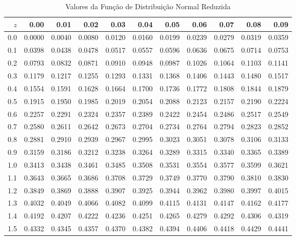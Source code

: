 \begin{table}[ht]
\centering
\begin{minipage}{10cm}
\caption{Valores da Função de Distribuição Normal Reduzida}
\end{minipage}
\begin{tabular}{r||rrrrrrrrrr}
  \hline
 $z$ & 0.00 & 0.01 & 0.02 & 0.03 & 0.04 & 0.05 & 0.06 & 0.07 & 0.08 & 0.09 \\ 
  \hline
  0.0 & 0.0000 & 0.0040 & 0.0080 & 0.0120 & 0.0160 & 0.0199 & 0.0239 & 0.0279 & 0.0319 & 0.0359 \\ 
  0.1 & 0.0398 & 0.0438 & 0.0478 & 0.0517 & 0.0557 & 0.0596 & 0.0636 & 0.0675 & 0.0714 & 0.0753 \\ 
  0.2 & 0.0793 & 0.0832 & 0.0871 & 0.0910 & 0.0948 & 0.0987 & 0.1026 & 0.1064 & 0.1103 & 0.1141 \\ 
  0.3 & 0.1179 & 0.1217 & 0.1255 & 0.1293 & 0.1331 & 0.1368 & 0.1406 & 0.1443 & 0.1480 & 0.1517 \\ 
  0.4 & 0.1554 & 0.1591 & 0.1628 & 0.1664 & 0.1700 & 0.1736 & 0.1772 & 0.1808 & 0.1844 & 0.1879 \\ 
  0.5 & 0.1915 & 0.1950 & 0.1985 & 0.2019 & 0.2054 & 0.2088 & 0.2123 & 0.2157 & 0.2190 & 0.2224 \\ 
  0.6 & 0.2257 & 0.2291 & 0.2324 & 0.2357 & 0.2389 & 0.2422 & 0.2454 & 0.2486 & 0.2517 & 0.2549 \\ 
  0.7 & 0.2580 & 0.2611 & 0.2642 & 0.2673 & 0.2704 & 0.2734 & 0.2764 & 0.2794 & 0.2823 & 0.2852 \\ 
  0.8 & 0.2881 & 0.2910 & 0.2939 & 0.2967 & 0.2995 & 0.3023 & 0.3051 & 0.3078 & 0.3106 & 0.3133 \\ 
  0.9 & 0.3159 & 0.3186 & 0.3212 & 0.3238 & 0.3264 & 0.3289 & 0.3315 & 0.3340 & 0.3365 & 0.3389 \\ 
  1.0 & 0.3413 & 0.3438 & 0.3461 & 0.3485 & 0.3508 & 0.3531 & 0.3554 & 0.3577 & 0.3599 & 0.3621 \\ 
  1.1 & 0.3643 & 0.3665 & 0.3686 & 0.3708 & 0.3729 & 0.3749 & 0.3770 & 0.3790 & 0.3810 & 0.3830 \\ 
  1.2 & 0.3849 & 0.3869 & 0.3888 & 0.3907 & 0.3925 & 0.3944 & 0.3962 & 0.3980 & 0.3997 & 0.4015 \\ 
  1.3 & 0.4032 & 0.4049 & 0.4066 & 0.4082 & 0.4099 & 0.4115 & 0.4131 & 0.4147 & 0.4162 & 0.4177 \\ 
  1.4 & 0.4192 & 0.4207 & 0.4222 & 0.4236 & 0.4251 & 0.4265 & 0.4279 & 0.4292 & 0.4306 & 0.4319 \\ 
  1.5 & 0.4332 & 0.4345 & 0.4357 & 0.4370 & 0.4382 & 0.4394 & 0.4406 & 0.4418 & 0.4429 & 0.4441 \\ 

\end{tabular}
\end{table}
